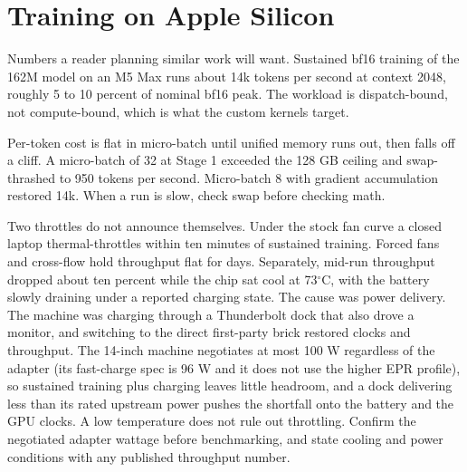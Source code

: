 \appendix
\section{Training on Apple Silicon}
\label{app:silicon}
Numbers a reader planning similar work will want. Sustained bf16
training of the 162M model on an M5 Max runs about 14k tokens per
second at context 2048, roughly 5 to 10 percent of nominal bf16 peak.
The workload is dispatch-bound, not compute-bound, which is what the
custom kernels target.

Per-token cost is flat in micro-batch until unified memory runs out,
then falls off a cliff. A micro-batch of 32 at Stage 1 exceeded the
128 GB ceiling and swap-thrashed to 950 tokens per second. Micro-batch
8 with gradient accumulation restored 14k. When a run is slow, check
swap before checking math.

Two throttles do not announce themselves. Under the stock fan curve a
closed laptop thermal-throttles within ten minutes of sustained
training. Forced fans and cross-flow hold throughput flat for days.
Separately, mid-run throughput dropped about ten percent while the chip
sat cool at 73$^\circ$C, with the battery slowly draining under a
reported charging state. The cause was power delivery. The machine was
charging through a Thunderbolt dock that also drove a monitor, and
switching to the direct first-party brick restored clocks and
throughput. The 14-inch machine negotiates at most 100 W regardless of
the adapter (its fast-charge spec is 96 W and it does not use the
higher EPR profile), so sustained training plus charging leaves little
headroom, and a dock delivering less than its rated upstream power
pushes the shortfall onto the battery and the GPU clocks. A low
temperature does not rule out throttling. Confirm the negotiated
adapter wattage before benchmarking, and state cooling and power
conditions with any published throughput number.
